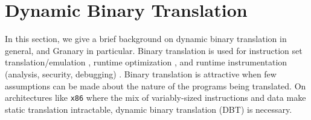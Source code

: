 \documentclass[letterpaper,twocolumn,10pt]{article}
\newcommand{\comment}[1]{}
\begin{document}
%	

\section{Dynamic Binary Translation}\label{sec:dbt}

In this section, we give a brief background on dynamic binary translation in general, and Granary in particular. Binary translation is used for instruction set translation/emulation \cite{QEMU}, runtime optimization \cite{DynamoRIOOptimisation}, and runtime instrumentation (analysis, security, debugging) \cite{Vx32,NaCl,Valgrind}. Binary translation is attractive when few assumptions can be made about the nature of the programs being translated. On architectures like \texttt{x86} where the mix of variably-sized instructions and data make static translation intractable, dynamic binary translation (DBT) is necessary.
\end{document}
